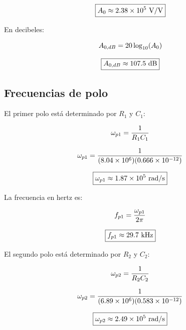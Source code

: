 \begin{equation}\notag
\boxed{
A_0\approx 2.38\times 10^{5}\ \mathrm{V/V}
}
\end{equation}

En decibeles:

\begin{equation}\notag
A_{0,dB}=20\log_{10}(A_0)
\end{equation}

\begin{equation}\notag
\boxed{
A_{0,dB}\approx 107.5\ \mathrm{dB}
}
\end{equation}

\subsection*{Frecuencias de polo}

El primer polo está determinado por \(R_1\) y \(C_1\):

\begin{equation}\notag
\omega_{p1}=\frac{1}{R_1C_1}
\end{equation}

\begin{equation}\notag
\omega_{p1}
=
\frac{1}{(8.04\times 10^{6})(0.666\times 10^{-12})}
\end{equation}

\begin{equation}\notag
\boxed{
\omega_{p1}\approx 1.87\times 10^{5}\ \mathrm{rad/s}
}
\end{equation}

La frecuencia en hertz es:

\begin{equation}\notag
f_{p1}=
\frac{\omega_{p1}}{2\pi}
\end{equation}

\begin{equation}\notag
\boxed{
f_{p1}\approx 29.7\ \mathrm{kHz}
}
\end{equation}

El segundo polo está determinado por \(R_2\) y \(C_2\):

\begin{equation}\notag
\omega_{p2}=\frac{1}{R_2C_2}
\end{equation}

\begin{equation}\notag
\omega_{p2}
=
\frac{1}{(6.89\times 10^{6})(0.583\times 10^{-12})}
\end{equation}

\begin{equation}\notag
\boxed{
\omega_{p2}\approx 2.49\times 10^{5}\ \mathrm{rad/s}
}
\end{equation}

